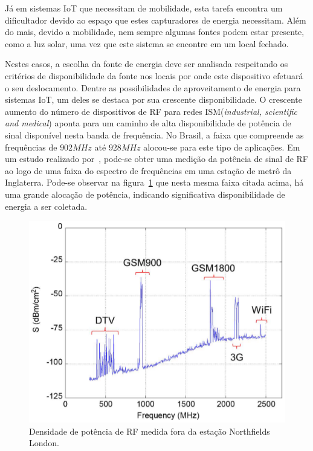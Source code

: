 Já em sistemas IoT que necessitam de mobilidade, esta tarefa encontra um dificultador devido ao espaço que estes capturadores de energia necessitam. Além do mais, devido a mobilidade, nem sempre algumas fontes podem estar presente, como a luz solar, uma vez que este sistema se encontre em um local fechado. 

Nestes casos, a escolha da fonte de energia deve ser analisada respeitando os critérios de disponibilidade da fonte nos locais por onde este dispositivo efetuará o seu deslocamento. Dentre as possibilidades de aproveitamento de energia para sistemas IoT, um deles se destaca por sua crescente disponibilidade. O crescente aumento do número de dispositivos de RF para redes ISM(\textit{industrial, scientific and medical}) aponta para um caminho de alta disponibilidade de potência de sinal disponível nesta banda de frequência. No Brasil, a faixa que compreende as frequências de $902MHz$ até $928MHz$ alocou-se para este tipo de aplicações. Em um estudo realizado por~, pode-se obter uma medição da potência de sinal de RF ao logo de uma faixa do espectro de frequências em uma estação de metrô da Inglaterra. Pode-se observar na figura~\ref{fig:espectro} que nesta mesma faixa citada acima, há uma grande alocação de potência, indicando significativa disponibilidade de energia a ser coletada.

\begin{figure}
  \caption{Densidade de potência de RF medida fora da estação Northfields London.}
  \begin{center}
      \includegraphics[scale=0.4]{img/espectro.png}
  \end{center}
  \label{fig:espectro}
\end{figure}

